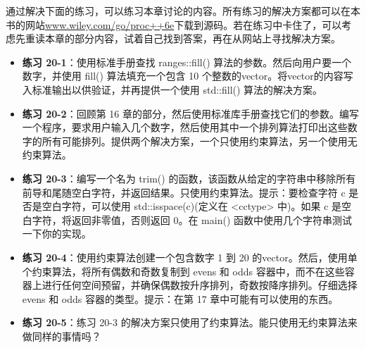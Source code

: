 通过解决下面的练习，可以练习本章讨论的内容。所有练习的解决方案都可以在本书的网站\url{www.wiley.com/go/proc++6e}下载到源码。若在练习中卡住了，可以考虑先重读本章的部分内容，试着自己找到答案，再在从网站上寻找解决方案。

\begin{itemize}
\item
\textbf{练习 20-1}：使用标准手册查找 ranges::fill() 算法的参数。然后向用户要一个数字，并使用 fill() 算法填充一个包含 10 个整数的vector。将vector的内容写入标准输出以供验证，并再提供一个使用 std::fill() 算法的解决方案。

\item
\textbf{练习 20-2}：回顾第 16 章的部分，然后使用标准库手册查找它们的参数。编写一个程序，要求用户输入几个数字，然后使用其中一个排列算法打印出这些数字的所有可能排列。提供两个解决方案，一个只使用约束算法，另一个使用无约束算法。

\item
\textbf{练习 20-3}：编写一个名为 trim() 的函数，该函数从给定的字符串中移除所有前导和尾随空白字符，并返回结果。只使用约束算法。提示：要检查字符 c 是否是空白字符，可以使用 std::isspace(c)(定义在 <cctype> 中)。如果 c 是空白字符，将返回非零值，否则返回 0。在 main() 函数中使用几个字符串测试一下你的实现。

\item
\textbf{练习 20-4}：使用约束算法创建一个包含数字 1 到 20 的vector。然后，使用单个约束算法，将所有偶数和奇数复制到 evens 和 odds 容器中，而不在这些容器上进行任何空间预留，并确保偶数按升序排列，奇数按降序排列。仔细选择 evens 和 odds 容器的类型。提示：在第 17 章中可能有可以使用的东西。

\item
\textbf{练习 20-5}：练习 20-3 的解决方案只使用了约束算法。能只使用无约束算法来做同样的事情吗？
\end{itemize}












